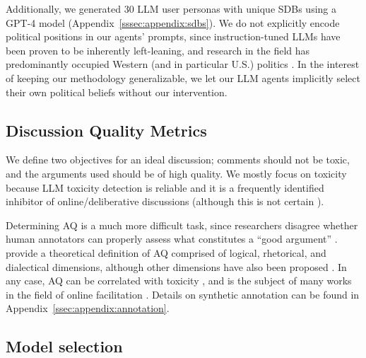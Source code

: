 Additionally, we generated 30 \ac{LLM} user personas with unique \acp{SDB} using a GPT-4 model \cite{openai2024gpt4technicalreport} (Appendix~\ref{sssec:appendix:sdbs}). We do not explicitly encode political positions in our agents' prompts, since instruction-tuned \acp{LLM} have been proven to be inherently left-leaning, and research in the field has predominantly occupied Western (and in particular U.S.) politics \cite{Taubenfeld2024SystematicBI, potter-etal-2024-hidden, political_2024, pit2024oninvestigatingpoliticalstance}. In the interest of keeping our methodology generalizable, we let our \ac{LLM} agents implicitly select their own political beliefs without our intervention.


\subsection{Discussion Quality Metrics}
\label{ssec:experimental:metrics}

We define two objectives for an ideal discussion; comments should not be toxic, and the arguments used should be of high quality. We mostly focus on toxicity because \ac{LLM} toxicity detection is reliable \citep{kang-qian-2024-implanting, Wang2022ToxicityDW, anjum2024hate} and it is a frequently identified inhibitor of online/deliberative discussions \citep{dekock2022disagree, XiaToxicity} (although this is not certain \citep{Avalle2024PersistentIP}). 

Determining \ac{AQ} is a much more difficult task, since researchers disagree whether human annotators can properly assess what constitutes a “good argument” \cite{wachsmuth-etal-2017-computational, argyle2023}. \citet{wachsmuth-etal-2017-computational} provide a theoretical definition of \ac{AQ} comprised of logical, rhetorical, and dialectical dimensions, although other dimensions have also been proposed \cite{habernal-gurevych-2016-argument, persing-ng-2015-modeling}. In any case, \ac{AQ} can be correlated with toxicity \cite{chang-danescu-niculescu-mizil-2019-trouble}, and is the subject of many works in the field of online facilitation \cite{argyle2023, schroeder-etal-2024-fora, falk-etal-2024-moderation, falk-etal-2021-predicting}. 
Details on synthetic annotation can be found in Appendix~\ref{ssec:appendix:annotation}.


\subsection{Model selection}
\label{ssec:experimental:model}

